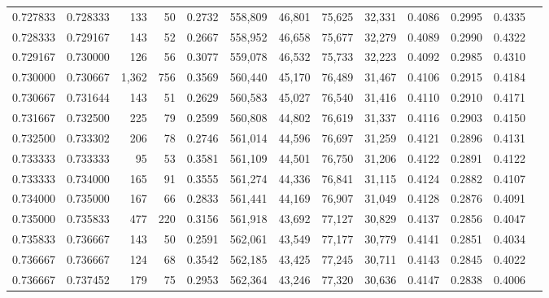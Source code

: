 \begin{tabular}{rrrrrrrrrrrrr}
0.727833 & 0.728333 &   133 &  50 &                                     0.2732 & 558,809 &  46,801 &  75,625 &  32,331 & 0.4086 & 0.2995 & 0.4335 \\
0.728333 & 0.729167 &   143 &  52 &                                     0.2667 & 558,952 &  46,658 &  75,677 &  32,279 & 0.4089 & 0.2990 & 0.4322 \\
0.729167 & 0.730000 &   126 &  56 &                                     0.3077 & 559,078 &  46,532 &  75,733 &  32,223 & 0.4092 & 0.2985 & 0.4310 \\
0.730000 & 0.730667 & 1,362 & 756 &                                     0.3569 & 560,440 &  45,170 &  76,489 &  31,467 & 0.4106 & 0.2915 & 0.4184 \\
0.730667 & 0.731644 &   143 &  51 &                                     0.2629 & 560,583 &  45,027 &  76,540 &  31,416 & 0.4110 & 0.2910 & 0.4171 \\
0.731667 & 0.732500 &   225 &  79 &                                     0.2599 & 560,808 &  44,802 &  76,619 &  31,337 & 0.4116 & 0.2903 & 0.4150 \\
0.732500 & 0.733302 &   206 &  78 &                                     0.2746 & 561,014 &  44,596 &  76,697 &  31,259 & 0.4121 & 0.2896 & 0.4131 \\
0.733333 & 0.733333 &    95 &  53 &                                     0.3581 & 561,109 &  44,501 &  76,750 &  31,206 & 0.4122 & 0.2891 & 0.4122 \\
0.733333 & 0.734000 &   165 &  91 &                                     0.3555 & 561,274 &  44,336 &  76,841 &  31,115 & 0.4124 & 0.2882 & 0.4107 \\
0.734000 & 0.735000 &   167 &  66 &                                     0.2833 & 561,441 &  44,169 &  76,907 &  31,049 & 0.4128 & 0.2876 & 0.4091 \\
0.735000 & 0.735833 &   477 & 220 &                                     0.3156 & 561,918 &  43,692 &  77,127 &  30,829 & 0.4137 & 0.2856 & 0.4047 \\
0.735833 & 0.736667 &   143 &  50 &                                     0.2591 & 562,061 &  43,549 &  77,177 &  30,779 & 0.4141 & 0.2851 & 0.4034 \\
0.736667 & 0.736667 &   124 &  68 &                                     0.3542 & 562,185 &  43,425 &  77,245 &  30,711 & 0.4143 & 0.2845 & 0.4022 \\
0.736667 & 0.737452 &   179 &  75 &                                     0.2953 & 562,364 &  43,246 &  77,320 &  30,636 & 0.4147 & 0.2838 & 0.4006 \\

\end{tabular}
